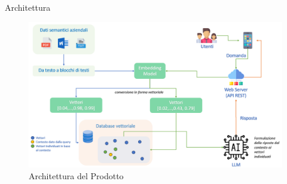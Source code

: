 \documentclass{beamer}
\begin{document}




\begin{frame}{Architettura}
    \begin{figure}[h]
        \centering
        \includegraphics[width=1\textwidth]{../../img/architettura.png}
        \caption{Architettura del Prodotto}
        \label{fig:architettura}
    \end{figure}

\end{frame}
\end{document}
